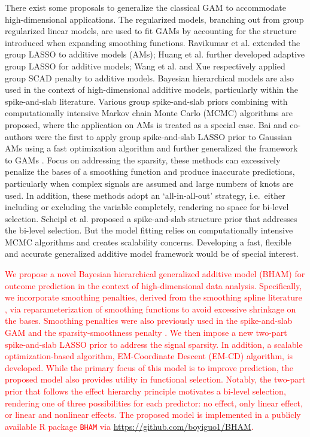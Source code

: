 \documentclass[AMA,STIX1COL,]{WileyNJD-v2}
\begin{document}
There exist some proposals to generalize the classical GAM to
accommodate high-dimensional applications. The regularized models,
branching out from group regularized linear models, are used to fit GAMs
by accounting for the structure introduced when expanding smoothing
functions. Ravikumar et al. \citep{Ravikumar2009} extended the group
LASSO \citep{Yuan2006} to additive models (AMs); Huang et al.
\citep{Huang2010} further developed adaptive group LASSO for additive
models; Wang et al. \citep{Wang2007} and Xue \citep{Xue2009}
respectively applied group SCAD penalty \citep{Fan2001} to additive
models. Bayesian hierarchical models are also used in the context of
high-dimensional additive models, particularly within the spike-and-slab
literature. Various group spike-and-slab priors \citep{Xu2015, Yang2020}
combining with computationally intensive Markov chain Monte Carlo (MCMC)
algorithms are proposed, where the application on AMs is treated as a
special case. Bai and co-authors\citep{Bai2020} were the first to apply
group spike-and-slab LASSO prior to Gaussian AMs using a fast
optimization algorithm and further generalized the framework to GAMs
\citep{Bai2021}. Focus on addressing the sparsity, these methods can
excessively penalize the bases of a smoothing function and produce
inaccurate predictions, particularly when complex signals are assumed
and large numbers of knots are used. \citep{Scheipl2013} In addition,
these methods adopt an `all-in-all-out' strategy, i.e.~either including
or excluding the variable completely, rendering no space for bi-level
selection. Scheipl et al. \citep{Scheipl2012} proposed a spike-and-slab
structure prior that addresses the bi-level selection. But the model
fitting relies on computationally intensive MCMC algorithms and creates
scalability concerns. Developing a fast, flexible and accurate
generalized additive model framework would be of special interest.

\textcolor{red}{We propose a novel Bayesian hierarchical generalized additive model (BHAM) for outcome prediction in the context of high-dimensional data analysis. Specifically, we incorporate smoothing penalties, derived from the smoothing spline literature \cite{Wood2017}, via reparameterization of smoothing functions to avoid excessive shrinkage on the bases. Smoothing penalties were also previously used in the spike-and-slab GAM \cite{Scheipl2012} and the sparsity-smoothness penalty \cite{Meier2009}. We then impose a new two-part spike-and-slab LASSO prior to address the signal sparsity. In addition, a scalable optimization-based algorithm, EM-Coordinate Descent (EM-CD) algorithm, is developed. While the primary focus of this model is to improve prediction, the proposed model also provides utility in functional selection. Notably, the two-part prior that follows the effect hierarchy principle motivates a bi-level selection, rendering one of three possibilities for each predictor: no effect, only linear effect, or linear and nonlinear effects. The proposed model is implemented in a publicly available R package \texttt{BHAM} via \url{https://github.com/boyiguo1/BHAM}.}
\end{document}

